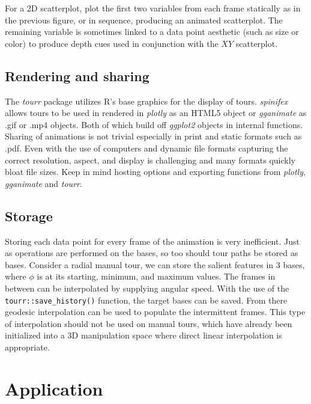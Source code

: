 \documentclass{monashthesis}
\begin{document}
For a 2D scatterplot, plot the first two variables from each frame statically as in the previous figure, or in sequence, producing an animated scatterplot. The remaining variable is sometimes linked to a data point aesthetic (such as size or color) to produce depth cues used in conjunction with the \(XY\) scatterplot.

\hypertarget{rendering-and-sharing}{%
\subsection{Rendering and sharing}\label{rendering-and-sharing}}

The \emph{tourr} package utilizes R's base graphics for the display of tours. \emph{spinifex} allows tours to be used in rendered in \emph{plotly} \textcite{sievert_plotly_2018} as an HTML5 object or \emph{gganimate} \textcite{pedersen_gganimate:_2019} as .gif or .mp4 objects. Both of which build off \emph{ggplot2} objects in internal functions. Sharing of animations is not trivial especially in print and static formats such as .pdf. Even with the use of computers and dynamic file formats capturing the correct resolution, aspect, and display is challenging and many formats quickly bloat file sizes. Keep in mind hosting options and exporting functions from \emph{plotly}, \emph{gganimate} and \emph{tourr}.

\hypertarget{storage}{%
\subsection{Storage}\label{storage}}

Storing each data point for every frame of the animation is very inefficient. Just as operations are performed on the bases, so too should tour paths be stored as bases. Consider a radial manual tour, we can store the salient features in 3 bases, where \(\phi\) is at its starting, minimum, and maximum values. The frames in between can be interpolated by supplying angular speed. With the use of the \texttt{tourr::save\_history()} function, the target bases can be saved. From there geodesic interpolation can be used to populate the intermittent frames. This type of interpolation should not be used on manual tours, which have already been initialized into a 3D manipulation space where direct linear interpolation is appropriate.

\hypertarget{sec:application}{%
\section{Application}\label{sec:application}}
\end{document}
